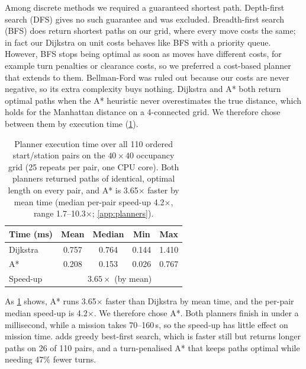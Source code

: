 Among discrete methods we required a guaranteed shortest path. Depth-first search (DFS) gives no such guarantee and was excluded. Breadth-first search (BFS) does return shortest paths on our grid, where every move costs the same; in fact our Dijkstra on unit costs behaves like BFS with a priority queue. However, BFS stops being optimal as soon as moves have different costs, for example turn penalties or clearance costs, so we preferred a cost-based planner that extends to them. Bellman-Ford was ruled out because our costs are never negative, so its extra complexity buys nothing. Dijkstra and A* both return optimal paths when the A* heuristic never overestimates the true distance, which holds for the Manhattan distance on a 4-connected grid. We therefore chose between them by execution time (\cref{tab:planner-timing}).

\begin{table}[tbp]
  \centering\small
  \setlength{\tabcolsep}{4pt}
  \begin{tabular}{@{}lcccc@{}}
    \toprule
    Time (ms) & Mean & Median & Min & Max \\
    \midrule
    Dijkstra & 0.757 & 0.764 & 0.144 & 1.410 \\
    A*       & 0.208 & 0.153 & 0.026 & 0.767 \\
    \midrule
    Speed-up & \multicolumn{4}{c}{$3.65\times$ (by mean)} \\
    \bottomrule
  \end{tabular}
  \caption{Planner execution time over all 110 ordered start/station pairs on the $40\times40$ occupancy grid (25 repeats per pair, one CPU core). Both planners returned paths of identical, optimal length on every pair, and A* is 3.65$\times$ faster by mean time (median per-pair speed-up 4.2$\times$, range 1.7--10.3$\times$; \cref{app:planners}).}
  \label{tab:planner-timing}
\end{table}

As \cref{tab:planner-timing} shows, A* runs 3.65$\times$ faster than Dijkstra by mean time, and the per-pair median speed-up is 4.2$\times$. We therefore chose A*. Both planners finish in under a millisecond, while a mission takes 70--160\,s, so the speed-up has little effect on mission time.  adds greedy best-first search, which is faster still but returns longer paths on 26 of 110 pairs, and a turn-penalised A* that keeps paths optimal while needing 47\% fewer turns.

